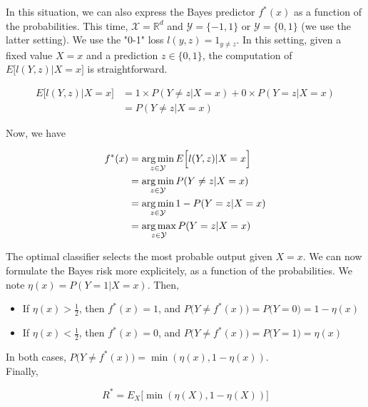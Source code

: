 \documentclass[
10pt, %
a4paper, %
oneside, %
headinclude,footinclude, %
BCOR5mm, %
]{scrartcl}
\begin{document}
In this situation, we can also express the Bayes predictor $f^*(x)$ as a
function of the probabilities. This time, $ \mathcal{X} = \mathbb{R}^d$ and $
\mathcal{Y}  = \{-1, 1\}$ or $ \mathcal{Y}  = \{0, 1\}$ (we use the latter
setting). We use the "0-1" loss $l(y,z) = 1_{y\neq z}$. In this setting, given a fixed value $X=x$ and a prediction $z\in \{0, 1\}$,
the computation of $E\Big[l(Y,z)|X=x\Big]$ is
straightforward.

\begin{equation}
    \begin{aligned}
        \label{eq:}
        E\Big[l(Y,z)|X=x\Big] &= 1 \times P(Y\neq z|X=x)+0\times P(Y=z|X=x)\\
        &=  P(Y\neq z|X=x)
    \end{aligned}
\end{equation}


Now, we have

    \begin{equation}
        \begin{aligned}
            \label{eq:}
	    f^*(x)&= \operatorname*{arg\,min}_{z\in \mathcal{Y} }E\Big[l(Y,z)|X=x\Big]\\
	    &= \operatorname*{arg\,min}_{z\in \mathcal{Y} }P(Y\neq z|X=x)\\
	    &= \operatorname*{arg\,min}_{z\in \mathcal{Y} }1-P(Y=z|X=x)\\
	    &= \operatorname*{arg\,max}_{z\in \mathcal{Y} }P(Y=z|X=x)
        \end{aligned}
    \end{equation}

    The optimal classifier selects the most probable output given $X=x$. We can
    now formulate the Bayes risk more explicitely, as a function of the
    probabilities. We note $\eta(x) = P(Y=1|X=x)$. Then, 
    \begin{itemize}
        \item If $ \eta(x)> \frac{1}{2} $, then $f^*(x)=1$, and $P\big( Y\neq f^*(x)\big) =   P\big( Y=0\big)=1-\eta(x)$
	\item If $ \eta(x)< \frac{1}{2} $, then $f^*(x)=0$, and $P\big( Y\neq f^*(x)\big) =   P\big( Y=1\big)=\eta(x)$
    \end{itemize}

    In both cases, $P\big( Y\neq f^*(x)\big)= \min(\eta(x), 1-\eta(x))$.
    \\

    Finally,

    \begin{equation}
	R^* = E_X\Big[ \min(\eta(X), 1-\eta(X))\Big]
    \end{equation}
\end{document}
